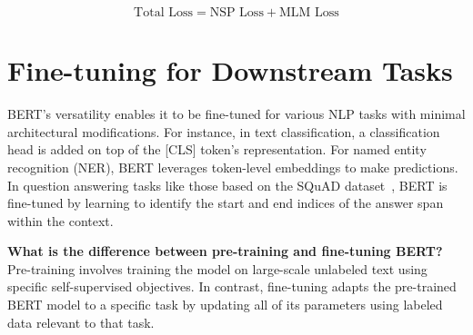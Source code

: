 \begin{equation}\label{eqn16}
    \text{Total Loss} = \text{NSP Loss} + \text{MLM Loss}
\end{equation}

\section{Fine-tuning for Downstream Tasks}
BERT's versatility enables it to be fine-tuned for various NLP tasks with minimal architectural modifications. For instance, in text classification, a classification head is added on top of the [CLS] token's representation. For named entity recognition (NER), BERT leverages token-level embeddings to make predictions. In question answering tasks like those based on the SQuAD dataset~\cite{rajpurkar2016squad}, BERT is fine-tuned by learning to identify the start and end indices of the answer span within the context.



\textbf{What is the difference between pre-training and fine-tuning BERT?} \\
Pre-training involves training the model on large-scale unlabeled text using specific self-supervised objectives. In contrast, fine-tuning adapts the pre-trained BERT model to a specific task by updating all of its parameters using labeled data relevant to that task.
